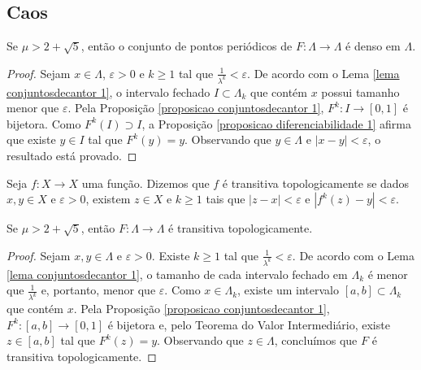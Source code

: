 \subsection{Caos}

\begin{proposition}
\label{proposicao caos 1}
Se $\mu > 2 + \sqrt{5}$, então o conjunto de pontos periódicos de $F: \Lambda \to \Lambda$ é denso em $\Lambda$.
\end{proposition}

\begin{proof}
Sejam $x \in \Lambda$, $\varepsilon > 0$ e $k \geq 1$ tal que $\frac{1}{\lambda^k} < \varepsilon$. De acordo com o Lema \ref{lema conjuntosdecantor 1}, o intervalo fechado $I \subset \Lambda_k$ que contém $x$ possui tamanho menor que $\varepsilon$. Pela Proposição \ref{proposicao conjuntosdecantor 1}, $F^k: I \to [0, 1]$ é bijetora. Como $F^k(I) \supset I$, a Proposição \ref{proposicao diferenciabilidade 1} afirma que existe $y \in I$ tal que $F^k(y) = y$. Observando que $y \in \Lambda$ e $|x - y| < \varepsilon$, o resultado está provado.
\end{proof}

\begin{definition}
Seja $f: X \to X$ uma função. Dizemos que $f$ é transitiva topologicamente se dados $x, y \in X$ e $\varepsilon > 0$,  existem $z \in X$ e $k \geq 1$ tais que $|z - x| < \varepsilon$ e $|f^k(z) - y| < \varepsilon$.
\end{definition} 

\begin{proposition}
\label{proposicao caos 2}
Se $\mu > 2 + \sqrt{5}$, então $F: \Lambda \to \Lambda$ é transitiva topologicamente.
\end{proposition}

\begin{proof}
Sejam $x, y \in \Lambda$ e $\varepsilon > 0$. Existe $k \geq 1$ tal que $\frac{1}{\lambda^k} < \varepsilon$. De acordo com o Lema \ref{lema conjuntosdecantor 1}, o tamanho de cada intervalo fechado em $\Lambda_k$ é menor que $\frac{1}{\lambda^k}$ e, portanto, menor que $\varepsilon$. Como $x \in \Lambda_ k$, existe um intervalo $[a, b] \subset \Lambda_ k$ que contém $x$. Pela Proposição \ref{proposicao conjuntosdecantor 1}, $F^k: [a, b] \to [0, 1]$ é bijetora e, pelo Teorema do Valor Intermediário, existe $z \in [a, b]$ tal que $F^k(z) = y$. Observando que $z \in \Lambda$, concluímos que $F$ é transitiva topologicamente.
\end{proof}

